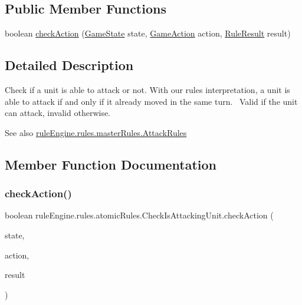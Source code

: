 \subsection*{Public Member Functions}
\begin{DoxyCompactItemize}
\item 
boolean \mbox{\hyperlink{classrule_engine_1_1rules_1_1atomic_rules_1_1_check_is_attacking_unit_a38eaf483b961fe287d49aede62f3aae5}{check\+Action}} (\mbox{\hyperlink{classgame_1_1game_state_1_1_game_state}{Game\+State}} state, \mbox{\hyperlink{classrule_engine_1_1_game_action}{Game\+Action}} action, \mbox{\hyperlink{classrule_engine_1_1_rule_result}{Rule\+Result}} result)
\end{DoxyCompactItemize}


\subsection{Detailed Description}
Check if a unit is able to attack or not. With our rules interpretation, a unit is able to attack if and only if it already moved in the same turn.~\newline
 Valid if the unit can attack, invalid otherwise.

\begin{DoxySeeAlso}{See also}
\mbox{\hyperlink{classrule_engine_1_1rules_1_1master_rules_1_1_attack_rules}{rule\+Engine.\+rules.\+master\+Rules.\+Attack\+Rules}} 
\end{DoxySeeAlso}


\subsection{Member Function Documentation}
\mbox{\label{classrule_engine_1_1rules_1_1atomic_rules_1_1_check_is_attacking_unit_a38eaf483b961fe287d49aede62f3aae5}} 
\subsubsection{\texorpdfstring{check\+Action()}{checkAction()}}
{\footnotesize\ttfamily boolean rule\+Engine.\+rules.\+atomic\+Rules.\+Check\+Is\+Attacking\+Unit.\+check\+Action (\begin{DoxyParamCaption}\item[{\mbox{\hyperlink{classgame_1_1game_state_1_1_game_state}{Game\+State}}}]{state,  }\item[{\mbox{\hyperlink{classrule_engine_1_1_game_action}{Game\+Action}}}]{action,  }\item[{\mbox{\hyperlink{classrule_engine_1_1_rule_result}{Rule\+Result}}}]{result }\end{DoxyParamCaption})\hspace{0.3cm}{\ttfamily [inline]}}



